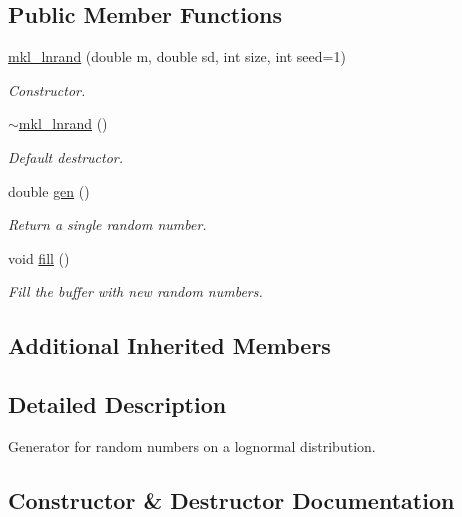 \subsection*{Public Member Functions}
\begin{DoxyCompactItemize}
\item 
\hyperlink{classmklrand_1_1mkl__lnrand_a39faf5aa38fae7ac1ef6e3f473ccf8a2}{mkl\+\_\+lnrand} (double m, double sd, int size, int seed=1)
\begin{DoxyCompactList}\small\item\em Constructor. \end{DoxyCompactList}\item 
\hyperlink{classmklrand_1_1mkl__lnrand_adb4d71f9ee8992fa1e595af7ec7005c3}{$\sim$mkl\+\_\+lnrand} ()
\begin{DoxyCompactList}\small\item\em Default destructor. \end{DoxyCompactList}\item 
double \hyperlink{classmklrand_1_1mkl__lnrand_a3eba34d1b1f2f448a782eb06a03459e5}{gen} ()
\begin{DoxyCompactList}\small\item\em Return a single random number. \end{DoxyCompactList}\item 
void \hyperlink{classmklrand_1_1mkl__lnrand_ac43f4c40429885f5306dce10adf5d04a}{fill} ()
\begin{DoxyCompactList}\small\item\em Fill the buffer with new random numbers. \end{DoxyCompactList}\end{DoxyCompactItemize}
\subsection*{Additional Inherited Members}


\subsection{Detailed Description}
Generator for random numbers on a lognormal distribution. 

\subsection{Constructor \& Destructor Documentation}
